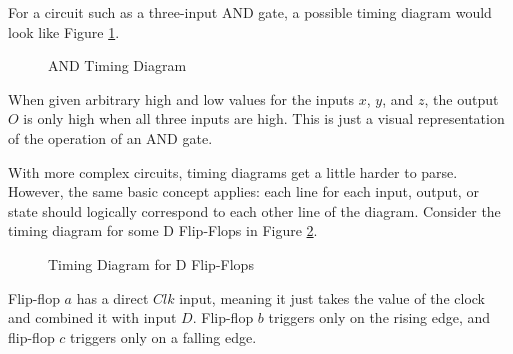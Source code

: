 \documentclass[12pt]{article}
\begin{document}
For a circuit such as a three-input AND gate, a possible timing diagram would look like
Figure \ref{fig:035}.

\begin{figure}[H]
  \centering
  
\end{figure}

\begin{figure}[H]
  \centering
  
  \caption{AND Timing Diagram}
  \label{fig:035}
\end{figure}

When given arbitrary high and low values for the inputs $x$, $y$, and $z$, the output $O$
is only high when all three inputs are high. This is just a visual representation of
the operation of an AND gate.

With more complex circuits, timing diagrams get a little harder to parse. However, the
same basic concept applies: each line for each input, output, or state should logically
correspond to each other line of the diagram. Consider the timing diagram for some D
Flip-Flops in Figure \ref{fig:timingDiagramForSomeDFlipFlops}.

\begin{figure}[H]
  \begin{subfigure}[H]{0.35\textwidth}
    \centering
    
  \end{subfigure}
  \begin{subfigure}[H]{0.55\textwidth}
    \centering
    
  \end{subfigure}
  \caption{Timing Diagram for D Flip-Flops}
  \label{fig:timingDiagramForSomeDFlipFlops}
\end{figure}

Flip-flop $a$ has a direct $Clk$ input, meaning it just takes the value of the clock and
combined it with input $D$. Flip-flop $b$ triggers only on the rising edge, and flip-flop
$c$ triggers only on a falling edge.
\end{document}
